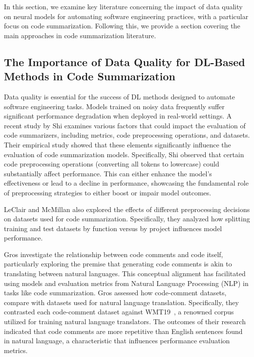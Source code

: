 In this section, we examine key literature concerning the impact of data quality on neural models for automating software engineering practices, with a particular focus on code summarization.
Following this, we provide a section covering the main approaches in code summarization literature.

\subsection{The Importance of Data Quality for DL-Based Methods in Code Summarization}
\label{sec:dataset-cleaning}

Data quality is essential for the success of DL methods designed to automate software engineering tasks. Models trained on noisy data frequently suffer significant performance degradation when deployed in real-world settings. A recent study by Shi \etal \cite{shi2022evaluation} examines various factors that could impact the evaluation of code summarizers, including metrics, code preprocessing operations, and datasets. Their empirical study showed that these elements significantly influence the evaluation of code summarization models. Specifically, Shi \etal observed that certain code preprocessing operations (\eg converting all tokens to lowercase) could substantially affect performance. This can either enhance the model's effectiveness or lead to a decline in performance, showcasing the fundamental role of preprocessing strategies to either boost or impair model outcomes. 

LeClair and McMillan \cite{leclair2019recommendations} also explored the effects of different preprocessing decisions on datasets used for code summarization. Specifically, they analyzed how splitting training and test datasets by function versus by project influences model performance.

Gros \etal \cite{gros2020code} investigate the relationship between code comments and code itself, particularly exploring the premise that generating code comments is akin to translating between natural languages. This conceptual alignment has facilitated using models and evaluation metrics from Natural Language Processing (NLP) in tasks like code summarization. Gros \etal assessed how code-comment datasets, 
compare with datasets used for natural language translation. Specifically, they contrasted each code-comment dataset against WMT19~\cite{barrault2019findings}, a renowned corpus utilized for training natural language translators. The outcomes of their research indicated that code comments are more repetitive than English sentences found in natural language, a characteristic that influences performance evaluation metrics.


